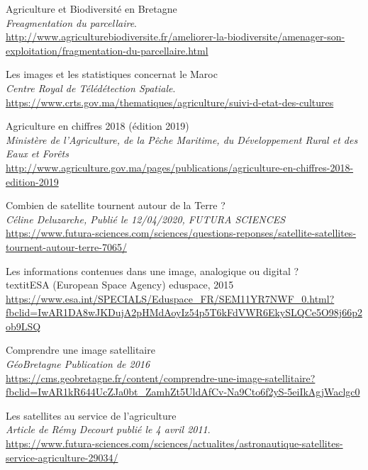 \documentclass[12pt, openany]{report}
\begin{document}
\begin{thebibliography}{9}

Agriculture et Biodiversité en Bretagne\\
\textit{Freagmentation du parcellaire}. \\
\url{http://www.agriculturebiodiversite.fr/ameliorer-la-biodiversite/amenager-son-exploitation/fragmentation-du-parcellaire.html}

Les images et les statistiques concernat le Maroc\\
\textit{Centre Royal de Télédétection Spatiale}.\\
\url{https://www.crts.gov.ma/thematiques/agriculture/suivi-d-etat-des-cultures}

Agriculture en chiffres 2018 (édition 2019)\\
\textit{Ministère de l'Agriculture, de la Pêche Maritime, du Développement Rural et des Eaux et Forêts}\\
\url{http://www.agriculture.gov.ma/pages/publications/agriculture-en-chiffres-2018-edition-2019}

Combien de satellite tournent autour de la Terre ?\\
\textit{Céline Deluzarche, Publié le 12/04/2020, FUTURA SCIENCES}\\
\url{https://www.futura-sciences.com/sciences/questions-reponses/satellite-satellites-tournent-autour-terre-7065/}

Les informations contenues dans une image, analogique ou digital ?\\
textit{ESA (European Space Agency) eduspace, 2015}\\
\url{https://www.esa.int/SPECIALS/Eduspace_FR/SEM11YR7NWF_0.html?fbclid=IwAR1DA8wJKDujA2pHMdAoyIz54p5T6kFdVWR6EkySLQCe5O98j66p2ob9LSQ}

Comprendre une image satellitaire\\
\textit{GéoBretagne Publication de 2016}\\
\url{https://cms.geobretagne.fr/content/comprendre-une-image-satellitaire?fbclid=IwAR1kR644UcZJa0bt_ZamhZt5UldAfCv-Na9Cto6f2yS-5eiIkAgjWaclgc0}

Les satellites au service de l'agriculture\\
\textit{Article de Rémy Decourt publié le 4 avril 2011}.\\
\url{https://www.futura-sciences.com/sciences/actualites/astronautique-satellites-service-agriculture-29034/}


\end{thebibliography}
\end{document}

